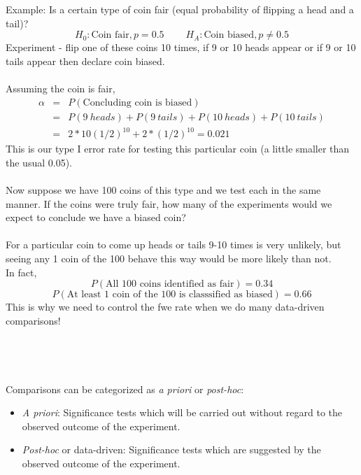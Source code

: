 Example:  Is a certain type of coin fair (equal probability of flipping a head and a tail)?
$$H_0: \mbox{Coin fair}, p=0.5~~~~~~~~~~H_A:\mbox{Coin biased}, p\neq 0.5$$
Experiment - flip one of these coins 10 times, if 9 or 10  heads appear or if 9 or 10 tails appear then declare coin biased.\\~\\
Assuming the coin is fair, 
\begin{eqnarray*}
\alpha & = & P(\mbox{Concluding coin is biased})\\
 & = & P(9~heads)+P(9~tails)+P(10~heads)+P(10~tails)\\
& = & 2*10(1/2)^{10}+2*(1/2)^{10}=0.021
\end{eqnarray*}
This is our type I error rate for testing this particular coin (a little smaller than the usual 0.05).\\~\\
Now suppose we have 100 coins of this type and we test each in the same manner.  If the coins were truly fair, how many of the experiments would we expect to conclude we have a biased coin?\\~\\
For a particular coin to come up heads or tails 9-10 times is very unlikely, but seeing any 1 coin of the 100 behave this way would be more likely than not.\\
In fact, 
$$P(\mbox{All 100 coins identified as fair})=0.34$$
$$P(\mbox{At least 1 coin of the 100 is classsified as biased})=0.66$$
This is why we need to control the fwe rate when we do many data-driven comparisons!\\~\\
\\~\\~\\
\color{black}
Comparisons can be categorized as {\em a priori} or {\em post-hoc}:
\begin{itemize}
\item {\em A priori}: Significance tests which will be carried out without regard to the observed outcome of the experiment.
\item {\em Post-hoc} or data-driven: Significance tests which are suggested by the observed outcome of the experiment.
\end{itemize}

